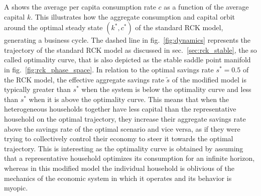 A shows the average per capita consumption rate $c$ as a function of the average capital $k$. 
This illustrates how the aggregate consumption and capital orbit around the optimal steady state $(k^\ast,c^\ast)$  of the standard RCK model, generating a business cycle. 
The dashed line in fig.~\ref{fig:dynamics} represents the trajectory of the standard RCK model as discussed in sec.~\ref{sec:rck_stable}, the so called optimality curve, that is also depicted as the stable saddle point manifold in fig.~\ref{fig:rck_phase_space}.
In relation to the optimal savings rate $s^\ast \!=\!0.5$ of the RCK model, the effective aggregate savings rate $\tilde{s}$ of the modified model is typically greater than $s^\ast$ when the system is below the optimality curve and less than $ s^\ast$ when it is above the optimality curve. This means that when the heterogeneous households together have less capital than the representative household on the optimal trajectory, they increase their aggregate savings rate above the savings rate of the optimal scenario and vice versa, as if they were trying to collectively control their economy to steer it towards the optimal trajectory.
This is interesting as the optimality curve is obtained by assuming that a representative household optimizes its consumption for an infinite horizon, whereas in this modified model the individual household is oblivious of the mechanics of the economic system in which it operates and its behavior is myopic.

